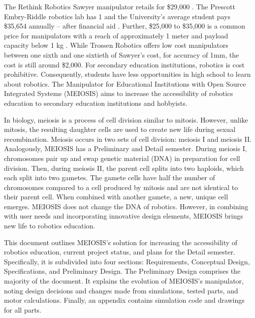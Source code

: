 The Rethink Robotics Sawyer manipulator retails for \$29,000 \cite{rr}. The Prescott Embry-Riddle robotics lab has 1 and the University's average student pays \$35,654 annually -- after financial aid \cite{ff}. Further, \$25,000 to \$35,000 is a common price for manipulators with a reach of approximately 1 meter and payload capacity below 1 kg \cite{gg}. While Trossen Robotics offers low cost manipulators between one sixth and one sixtieth of Sawyer’s cost, for accuracy of 1mm, the cost is still around \$2,000. For secondary education institutions, robotics is cost prohibitive. Consequently, students have less opportunities in high school to learn about robotics. The Manipulator for Educational Institutions with Open Source Integrated Systems (MEIOSIS) aims to increase the accessibility of robotics education to secondary education institutions and hobbyists.

In biology, meiosis is a process of cell division similar to mitosis. However, unlike mitosis, the resulting daughter cells are used to create new life during sexual recombination. Meiosis occurs in two sets of cell division: meiosis I and meiosis II. Analogously, MEIOSIS has a Preliminary and Detail semester. During meiosis I, chromosomes pair up and swap genetic material (DNA) in preparation for cell division. Then, during meiosis II, the parent cell splits into two haploids, which each split into two gametes. The gamete cells have half the number of chromosomes compared to a cell produced by mitosis and are not identical to their parent cell. When combined with another gamete, a new, unique cell emerges. MEIOSIS does not change the DNA of robotics. However, in combining with user needs and incorporating innovative design elements, MEIOSIS brings new life to robotics education.

This document outlines MEIOSIS’s solution for increasing the accessibility of robotics education, current project status, and plans for the Detail semester. Specifically, it is subdivided into four sections: Requirements, Conceptual Design, Specifications, and Preliminary Design. The Preliminary Design comprises the majority of the document. It explains the evolution of MEIOSIS’s manipulator, noting design decisions and changes made from simulations, tested parts, and motor calculations. Finally, an appendix contains simulation code and drawings for all parts.
